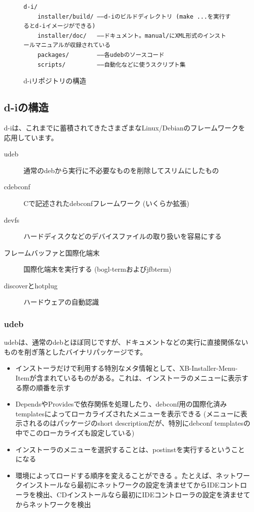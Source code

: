 \documentclass[mingoth,a4paper]{jsarticle}
\begin{document}
\begin{figure}[htbp]
\begin{verbatim}
d-i/
    installer/build/ ――d-iのビルドディレクトリ (make ...を実行するとd-iイメージができる)
    installer/doc/   ――ドキュメント。manual/にXML形式のインストールマニュアルが収録されている
    packages/        ――各udebのソースコード
    scripts/         ――自動化などに使うスクリプト集
\end{verbatim}
  \caption{d-iリポジトリの構造}
  \label{fig:direpo}
\end{figure}

\subsection{d-iの構造}
\label{sec:diinternal}

d-iは、これまでに蓄積されてきたさまざまなLinux/Debianのフレームワークを応用しています。

\begin{description}
\item[udeb] 通常のdebから実行に不必要なものを削除してスリムにしたもの
\item[cdebconf] Cで記述されたdebconfフレームワーク (いくらか拡張)
\item[devfs] ハードディスクなどのデバイスファイルの取り扱いを容易にする
\item[フレームバッファと国際化端末] 国際化端末を実行する (bogl-termおよびjfbterm)
\item[discoverとhotplug] ハードウェアの自動認識
\end{description}


\subsubsection{udeb}
\label{sec:udeb}

udebは、通常のdebとほぼ同じですが、ドキュメントなどの実行に直接関係ないものを削ぎ落としたバイナリパッケージです。

\begin{itemize}
\item インストーラだけで利用する特別なメタ情報として、XB-Installer-Menu-Itemが含まれているものがある。これは、インストーラのメニューに表示する際の順番を示す
\item DependsやProvidesで依存関係を処理したり、debconf用の国際化済みtemplatesによってローカライズされたメニューを表示できる (メニューに表示されるのはパッケージのshort descriptionだが、特別にdebconf templatesの中でこのローカライズも設定している)
\item インストーラのメニューを選択することは、postinstを実行するということになる
\item 環境によってロードする順序を変えることができる 。たとえば、ネットワークインストールなら最初にネットワークの設定を済ませてからIDEコントローラを検出、CDインストールなら最初にIDEコントローラの設定を済ませてからネットワークを検出
\end{itemize}
\end{document}
